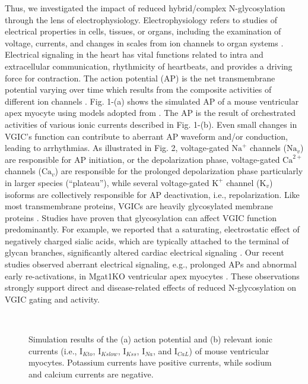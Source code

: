 \documentclass[journal]{IEEEtran}
\begin{document}
Thus, we investigated the impact of reduced hybrid/complex N-glycosylation through the lens of electrophysiology. Electrophysiology refers to studies of electrical properties in cells, tissues, or organs, including the examination of voltage, currents, and changes in scales from ion channels to organ systems \cite{scanziani2009electrophysiology}. Electrical signaling in the heart has vital functions related to intra and extracellular communication, rhythmicity of heartbeats, and provides a driving force for contraction. The action potential (AP) is the net transmembrane potential varying over time which results from the composite activities of different ion channels \cite{grant2009cardiac}. Fig. 1-(a) shows the simulated AP of a mouse ventricular apex myocyte using models adopted from \cite{bondarenko2004computer}. The AP is the result of orchestrated activities of various ionic currents described in Fig. 1-(b). Even small changes in VGIC's function can contribute to aberrant AP waveform and/or conduction, leading to arrhythmias. As illustrated in Fig. 2, voltage-gated $\text{Na}^{+}$ channels ($\text{Na}_{v}$) are responsible for AP initiation, or the depolarization phase, voltage-gated $\text{Ca}^{2+}$ channels ($\text{Ca}_{v}$) are responsible for the prolonged depolarization phase particularly in larger species (“plateau”), while several voltage-gated $\text{K}^{+}$ channel ($\text{K}_{v}$) isoforms are collectively responsible for AP deactivation, i.e., repolarization. Like most transmembrane proteins, VGICs are heavily glycosylated membrane proteins \cite{ednie2011modulation}. Studies have proven that glycosylation can affect VGIC function predominantly. For example, we reported that a saturating, electrostatic effect of negatively charged sialic acids, which are typically attached to the terminal of glycan branches, significantly altered cardiac electrical signaling \cite{ednie2013expression, ednie2015reduced}. Our recent studies observed aberrant electrical signaling, e.g., prolonged APs and abnormal early re-activations, in Mgat1KO ventricular apex myocytes \cite{ednie2019reduced, ednie2019reduced2}. These observations strongly support direct and disease-related effects of reduced N-glycosylation on VGIC gating and activity.
\begin{figure}
    \label{fig1}
    \centering
    \\
    \caption{Simulation results of the (a) action potential and (b) relevant ionic currents (i.e., $\text{I}_{Kto}$, $\text{I}_{Kslow}$, $\text{I}_{Kss}$, $\text{I}_{Na}$, and $\text{I}_{CaL}$) of mouse ventricular myocytes. Potassium currents have positive currents, while sodium and calcium currents are negative.}
\end{figure}
\end{document}
